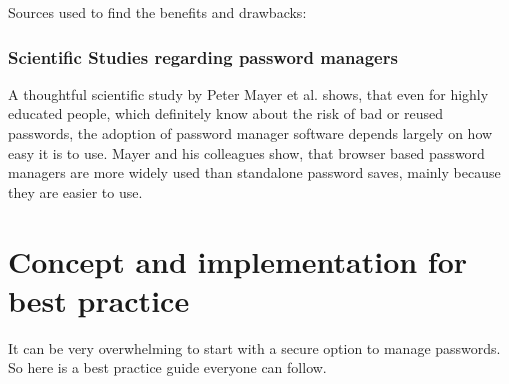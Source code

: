 \documentclass[conference]{IEEEtran}
\begin{document}
Sources used to find the benefits and drawbacks: \cite{b8}


\subsubsection{Scientific Studies regarding password managers}

A thoughtful scientific study by Peter Mayer et al. shows, that even for highly educated people, which definitely know about the risk of bad or reused passwords, the adoption of password manager software depends largely on how easy it is to use. Mayer and his colleagues show, that browser based password managers are more widely used than standalone password saves, mainly because they are easier to use.\cite{b13}


\section{Concept and implementation for best practice}

It can be very overwhelming to start with a secure option to manage passwords. So here is a best practice guide everyone can follow.
\end{document}

